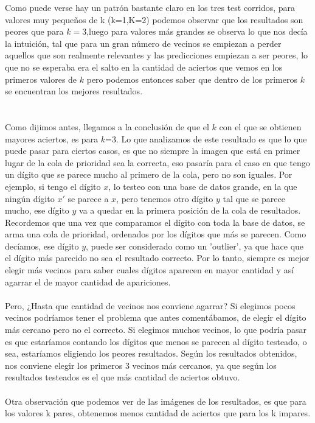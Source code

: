 Como puede verse hay un patrón bastante claro en los tres test corridos, para valores muy pequeños de k (k=1,K=2) podemos observar que los resultados son peores que para $k=3$,luego para valores más grandes se observa lo que nos decía la intuición, tal que para un gran número de vecinos se empiezan a perder aquellos que son realmente relevantes y las predicciones empiezan a ser peores, lo que no se esperaba era el salto en la cantidad de aciertos que vemos en los primeros valores de $k$ pero podemos entonces saber que dentro de los primeros $k$ se encuentran los mejores resultados.  
\\
\\ \\
Como dijimos antes, llegamos a la conclusión de que el $k$ con el que se obtienen mayores aciertos, es para $k$=3. Lo que analizamos de este resultado es que lo que puede pasar para ciertos casos, es que no siempre la imagen que está en primer lugar de la cola de prioridad sea la correcta, eso pasaría para el caso en que tengo un dígito que se parece mucho al primero de la cola, pero no son iguales.
Por ejemplo, si tengo el dígito $x$, lo testeo con una base de datos grande, en la que ningún dígito $x'$ se parece a $x$, pero tenemos otro dígito $y$ tal que se parece mucho, ese dígito $y$ va a quedar en la primera posición de la cola de resultados.
Recordemos que una vez que comparamos el dígito con toda la base de datos, se arma una cola de prioridad, ordenados por los dígitos que más se parecen.
Como decíamos, ese dígito $y$, puede ser considerado como un 'outlier', ya que hace que el dígito más parecido no sea el resultado correcto. Por lo tanto, siempre es mejor elegir más vecinos para saber cuales dígitos aparecen en mayor cantidad y así agarrar el de mayor cantidad de apariciones.
\\ \\
Pero, ¿Hasta que cantidad de vecinos nos conviene agarrar?
Si elegimos pocos vecinos podríamos tener el problema que antes comentábamos, de elegir el dígito más cercano pero no el correcto.
Si elegimos muchos vecinos, lo que podría pasar es que estaríamos contando los dígitos que menos se parecen al dígito testeado, o sea, estaríamos eligiendo los peores resultados.
Según los resultados obtenidos, nos conviene elegir los primeros 3 vecinos más cercanos, ya que según los resultados testeados es el que más cantidad de aciertos obtuvo.
\\ \\
Otra observación que podemos ver de las imágenes de los resultados, es que para los valores k pares, obtenemos menos cantidad de aciertos que para los k impares.

